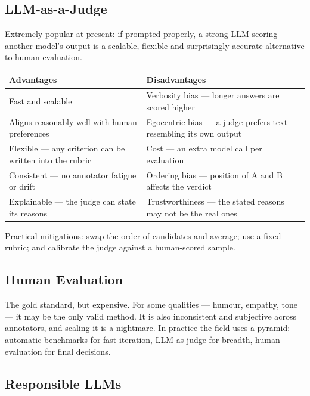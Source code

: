 \documentclass[11pt,a4paper]{article}
\begin{document}
\subsection{LLM-as-a-Judge}

Extremely popular at present: if prompted properly, a strong LLM scoring another model's
output is a scalable, flexible and surprisingly accurate alternative to human evaluation.

\begin{center}
\begin{tabularx}{\textwidth}{YY}
\textbf{Advantages} & \textbf{Disadvantages} \\
\hline
Fast and scalable & Verbosity bias --- longer answers are scored higher \\
Aligns reasonably well with human preferences & Egocentric bias --- a judge prefers text
resembling its own output \\
Flexible --- any criterion can be written into the rubric & Cost --- an extra model call per
evaluation \\
Consistent --- no annotator fatigue or drift & Ordering bias --- position of A and B affects
the verdict \\
Explainable --- the judge can state its reasons & Trustworthiness --- the stated reasons may
not be the real ones \\
\end{tabularx}
\end{center}
Practical mitigations: swap the order of candidates and average; use a fixed rubric; and
calibrate the judge against a human-scored sample.

\subsection{Human Evaluation}

The gold standard, but expensive. For some qualities --- humour, empathy, tone --- it may be
the only valid method. It is also inconsistent and subjective across annotators, and scaling
it is a nightmare. In practice the field uses a pyramid: automatic benchmarks for fast
iteration, LLM-as-judge for breadth, human evaluation for final decisions.

\subsection{Responsible LLMs}
\end{document}
